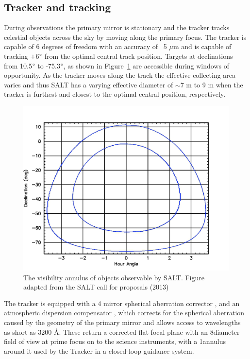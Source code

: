 \subsection{Tracker and tracking}

During observations the primary mirror is stationary and the tracker tracks celestial objects across the sky by moving along the primary focus. The tracker is capable of 6 degrees of freedom with an accuracy of ~5 $\mu$m and is capable of tracking $\pm$6$\degree$ from the optimal central track position. Targets at declinations from 10.5$\degree$ to -75.3$\degree$, as shown in Figure~\ref{fig:SALT_visibility} are accessible during windows of opportunity. As the tracker moves along the track the effective collecting area varies and thus SALT has a varying effective diameter of $\sim7$ m to 9 m when the tracker is furthest and closest to the optimal central position, respectively.
\prgph

\begin{figure}[t]
    \centering
    \includegraphics[width = 13cm]{figures/2_SALT_visibility.png}
    \caption{The visibility annulus of objects observable by SALT. Figure adapted from the SALT call for proposals (2013)\protect\footnotemark}
    \label{fig:SALT_visibility}
\end{figure}


The tracker is equipped with a 4 mirror spherical aberration corrector \citep{SALT_SAC}, and an atmospheric dispersion compensator \citep{SALT_ADC}, which corrects for the spherical aberration caused by the geometry of the primary mirror and allows access to wavelengths as short as 3200 \AA. These return a corrected flat focal plane with an 8\arcmin diameter field of view at prime focus on to the science instruments, with a 1\arcmin annulus around it used by the Tracker in a closed-loop guidance system.
\prgph

